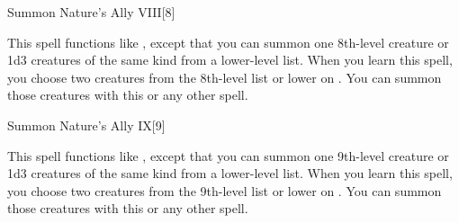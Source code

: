 \begin{spellsection}{Summon Nature's Ally VIII}[8]
    \begin{spellheader}
    \end{spellheader}
    \begin{spellcontent}
        \begin{spelltargetinginfo}
        \end{spelltargetinginfo}
        \begin{spelleffects}
            \spellspecial This spell functions like , except that you can summon one 8th-level creature or 1d3 creatures of the same kind from a lower-level list. When you learn this spell, you choose two creatures from the 8th-level list or lower on . You can summon those creatures with this or any other  spell.
            \spelldur \durshort \dismissable
        \end{spelleffects}
    \end{spellcontent}
    \begin{spellfooter}
        \miscastexplode
    \end{spellfooter}
\end{spellsection}

\begin{spellsection}{Summon Nature's Ally IX}[9]
    \begin{spellheader}
    \end{spellheader}
    \begin{spellcontent}
        \begin{spelltargetinginfo}
        \end{spelltargetinginfo}
        \begin{spelleffects}
            \spellspecial This spell functions like , except that you can summon one 9th-level creature or 1d3 creatures of the same kind from a lower-level list. When you learn this spell, you choose two creatures from the 9th-level list or lower on . You can summon those creatures with this or any other  spell.

            \spelldur \durshort \dismissable
        \end{spelleffects}
    \end{spellcontent}
    \begin{spellfooter}
        \miscastexplode
    \end{spellfooter}
\end{spellsection}

